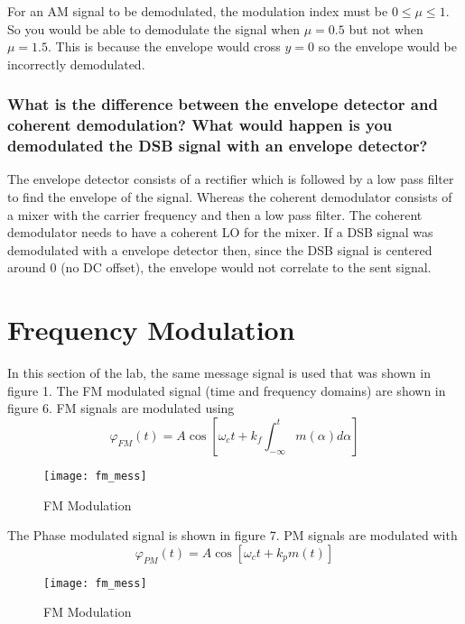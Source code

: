 \documentclass{article}
\begin{document}
    For an AM signal to be demodulated, the modulation index must be $0 \le \mu \le 1$. So you would
    be able to demodulate the signal when $\mu = 0.5$ but not when $\mu = 1.5$. This is because 
    the envelope would cross $y = 0$ so the envelope would be incorrectly demodulated. 

    \subsubsection{What is the difference between the envelope detector and coherent demodulation? 
    What would happen is you demodulated the DSB signal with an envelope detector?}

    The envelope detector consists of a rectifier which is followed by a low pass filter to find the 
    envelope of the signal. Whereas the coherent demodulator consists of a mixer with the carrier 
    frequency and then a low pass filter. The coherent demodulator needs to have a coherent 
    LO for the mixer. If a DSB signal was demodulated with a envelope detector then, since the DSB
    signal is centered around 0 (no DC offset), the envelope would not correlate to the sent signal.

    \section{Frequency Modulation}
    In this section of the lab, the same message signal is used that was shown in figure 1. The FM 
    modulated signal (time and frequency domains) are shown in figure 6. FM signals are modulated using
    \begin{equation}
        \varphi_{FM}(t) = A\cos [\omega_ct + k_f\int_{-\infty}^{t}m(\alpha)d\alpha]
    \end{equation}

    \begin{figure}[!htb]
        \centering
        \texttt{[image: fm\_mess]}
        \caption{FM Modulation}
    \end{figure}

    The Phase modulated signal is shown in figure 7. PM signals are modulated with
    \begin{equation}
        \varphi_{PM}(t) = A\cos[\omega_ct+k_pm(t)]
    \end{equation}

    \begin{figure}[!htb]
        \centering
        \texttt{[image: fm\_mess]}
        \caption{FM Modulation}
    \end{figure}
\end{document}
